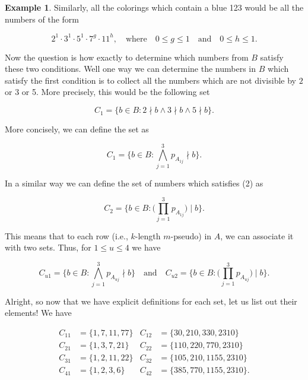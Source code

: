\documentclass{article}
\theoremstyle{definition}
\theoremstyle{remark}
\theoremstyle{definition}
\newtheorem{example}{Example}[section]
\begin{document}
\begin{example}
    \noindent Similarly, all the colorings which contain a blue 123 would be all the numbers of the form
    
    \begin{equation}
        2^1\cdot3^1\cdot5^1\cdot7^g\cdot11^h, \quad \text{where}\quad 0\leq g\leq 1\quad\text{and}\quad 0\leq h\leq 1.
    \end{equation}
    
    \noindent Now the question is how exactly to determine which numbers from $B$ satisfy these two conditions. Well one way we can determine the numbers in $B$ which satisfy the first condition is to collect all the numbers which are not divisible by $2$ or 3 or 5. More precisely, this would be the following set
    
    \begin{equation*}
        C_1=\{b\in B\colon 2\nmid b\wedge 3\nmid b\wedge 5\nmid b\}. 
    \end{equation*}
    
    \noindent More concisely, we can define the set as
    
    \begin{equation*}
        C_1 = \{b\in B\colon \bigwedge\limits_{j=1}^{3}p_{A_{1j}}\nmid b\}. 
    \end{equation*}
    
    \newpage In a similar way we can define the set of numbers which satisfies (2) as 
    
    \begin{equation*}
        C_2 = \{b\in B\colon \big(\prod\limits_{j=1}^3 p_{A_{1j}}\big)\mid b\}.
    \end{equation*}
    
    \noindent This means that to each row (i.e., $k$-length $m$-pseudo) in $A$, we can associate it with two sets. Thus, for $1\leq u\leq 4$ we have 
    
    \begin{equation*}
        C_{u1}=\{b\in B\colon \bigwedge\limits_{j=1}^3 p_{A_{uj}}\nmid b\}\quad\text{and}\quad C_{u2}=\{b\in B\colon\big(\prod\limits_{j=1}^{3} p_{A_{uj}}\big)\mid b\}.
    \end{equation*}
    
    \noindent Alright, so now that we have explicit definitions for each set, let us list out their elements! We have 
    
    \begin{align*}
        C_{11} &= \{1, 7, 11, 77\} &C_{12} &= \{30, 210, 330, 2310\} \\
        C_{21} &= \{1, 3, 7, 21\} &C_{22} &=\{110, 220, 770, 2310\} \\
        C_{31} &= \{1, 2, 11, 22\} &C_{32} &=\{105, 210, 1155, 2310\} \\
        C_{41} &= \{1, 2, 3, 6\} &C_{42} &=\{385, 770, 1155, 2310\}.
    \end{align*}
    

\end{example}
\end{document}
